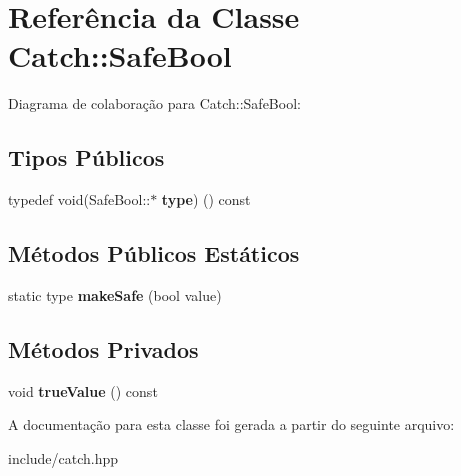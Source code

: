 \hypertarget{classCatch_1_1SafeBool}{}\section{Referência da Classe Catch\+:\+:Safe\+Bool}
\label{classCatch_1_1SafeBool}


Diagrama de colaboração para Catch\+:\+:Safe\+Bool\+:
\subsection*{Tipos Públicos}
\begin{DoxyCompactItemize}
\item 
typedef void(Safe\+Bool\+::$\ast$ {\bfseries type}) () const \hypertarget{classCatch_1_1SafeBool_a852cdacb020a98edeee0f4da4cf790d5}{}\label{classCatch_1_1SafeBool_a852cdacb020a98edeee0f4da4cf790d5}

\end{DoxyCompactItemize}
\subsection*{Métodos Públicos Estáticos}
\begin{DoxyCompactItemize}
\item 
static type {\bfseries make\+Safe} (bool value)\hypertarget{classCatch_1_1SafeBool_af0ea63d9820f8bf7a8b76377913c4e77}{}\label{classCatch_1_1SafeBool_af0ea63d9820f8bf7a8b76377913c4e77}

\end{DoxyCompactItemize}
\subsection*{Métodos Privados}
\begin{DoxyCompactItemize}
\item 
void {\bfseries true\+Value} () const \hypertarget{classCatch_1_1SafeBool_a1ec1f12d80b56e45142ffc9efeb09bb4}{}\label{classCatch_1_1SafeBool_a1ec1f12d80b56e45142ffc9efeb09bb4}

\end{DoxyCompactItemize}


A documentação para esta classe foi gerada a partir do seguinte arquivo\+:\begin{DoxyCompactItemize}
\item 
include/catch.\+hpp\end{DoxyCompactItemize}
